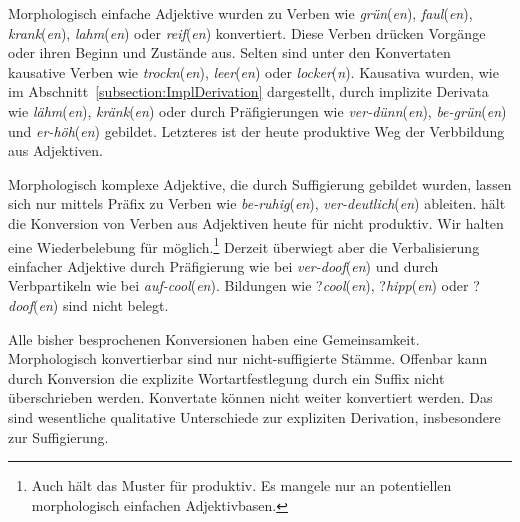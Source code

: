 Morphologisch einfache Adjektive wurden zu Verben wie \textit{grün}(\textit{en}), \textit{faul}(\textit{en}), \textit{krank}(\textit{en}), \textit{lahm}(\textit{en}) oder \textit{reif}(\textit{en}) konvertiert. Diese Verben drücken Vorgänge oder ihren Beginn und Zustände aus. Selten sind unter den Konvertaten kausative Verben wie \textit{trockn}(\textit{en}), \textit{leer}(\textit{en}) oder \textit{locker}(\textit{n}). Kausativa wurden, wie im Abschnitt~\ref{subsection:ImplDerivation} dargestellt, durch implizite Derivata wie \textit{lähm}(\textit{en}), \textit{kränk}(\textit{en}) oder durch Präfigierungen wie \textit{ver-dünn}(\textit{en}), \textit{be-grün}(\textit{en}) und \textit{er-höh}(\textit{en}) gebildet. Letzteres ist der heute produktive Weg der Verbbildung aus Adjektiven.

Morphologisch komplexe Adjektive, die durch Suffigierung gebildet wurden, lassen sich nur mittels Präfix zu Verben wie \textit{be-ruhig}(\textit{en}), \textit{ver-deutlich}(\textit{en}) ableiten. \citet[83]{Echenlohr1999} hält die Konversion von Verben aus Adjektiven heute für nicht produktiv. Wir halten eine Wiederbelebung für möglich.\footnote{Auch \citet[201]{Olsen1990Head} hält das Muster für produktiv. Es mangele nur an potentiellen morphologisch einfachen Adjektivbasen.} Derzeit überwiegt aber die Verbalisierung einfacher Adjektive durch Präfigierung wie bei \textit{ver-doof}(\textit{en}) und durch Verbpartikeln wie bei \textit{auf-cool}(\textit{en}). Bildungen wie ?\textit{cool}(\textit{en}), ?\textit{hipp}(\textit{en}) oder ?\textit{doof}(\textit{en}) sind nicht belegt.

Alle bisher besprochenen Konversionen haben eine Gemeinsamkeit. Morphologisch konvertierbar sind nur nicht-suffigierte Stämme. Offenbar kann durch Konversion die explizite Wortartfestlegung durch ein Suffix nicht überschrieben werden. Konvertate können nicht weiter konvertiert werden. Das sind wesentliche qualitative Unterschiede zur expliziten Derivation, insbesondere zur Suffigierung. 

